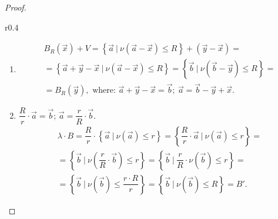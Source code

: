 \begin{proof}
{\begin{wrapfigure}{r}{0.4\textwidth}
\begin{tikzpicture}[x=0.75pt,y=0.75pt,yscale=-1,xscale=1]
    
    \end{tikzpicture}
\end{wrapfigure}   
    \begin{enumerate}
        \item 
        \[
            \begin{array}{c}
               \displaystyle B_R(\vec{x}) + V = \left\{\vec{a}\ | \ \nu\left(\vec{a} - \vec{x}\right) \leq R\right\} + \left(\vec{y} - \vec{x}\right) =  \\ 
               \displaystyle = \left\{\vec{a} + \vec{y} - \vec{x}\ | \ \nu\left(\vec{a} - \vec{x}\right) \leq R\right\} = \left\{\vec{b}\ | \ \nu\left(\vec{b} - \vec{y}\right) \leq R \right\} = \\
               \displaystyle = B_R(\vec{y}), \text{ where: } \vec{a} + \vec{y} - \vec{x} = \vec{b}; \ \vec{a} = \vec{b} - \vec{y} + \vec{x}.
            \end{array}
        \]
        \item $\dfrac{R}{r} \cdot \vec{a} = \vec{b}$; $\vec{a} = \dfrac{r}{R} \cdot \vec{b}$.
        \[
            \begin{array}{c}
                \displaystyle \lambda \cdot B = \dfrac{R}{r}\cdot \left\{\vec{a}\ | \ \nu\left(\vec{a}\right) \leq r\right\} = \left\{\dfrac{R}{r} \cdot \vec{a} \ | \ \nu\left(\vec{a}\right) \leq r\right\} = \\
                \displaystyle = \left\{\vec{b}\ | \ \nu\left(\dfrac{r}{R} \cdot \vec{b}\right) \leq r\right\} = \left\{\vec{b}\ | \ \dfrac{r}{R} \cdot \nu \left(\vec{b}\right) \leq r\right\} = \\
                \displaystyle = \left\{\vec{b}\ | \ \nu\left(\vec{b}\right) \leq \dfrac{r\cdot R}{r}\right\} = \left\{\vec{b} \ | \ \nu\left(\vec{b}\right) \leq R\right\} = B'.
            \end{array}  
        \]
    \end{enumerate} }
\end{proof}